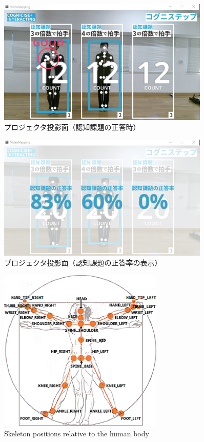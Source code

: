 \begin{figure}[tbp]
	\centering
			\includegraphics[width=0.9\textwidth]{chap2-figure/vm_clap.eps}
	\caption{プロジェクタ投影面（認知課題の正答時）}
	\label{fig:vm_clap}
\end{figure}

\begin{figure}[tbp]
	\centering
			\includegraphics[width=0.9\textwidth]{chap2-figure/vm_answer_rate.eps}
	\caption{プロジェクタ投影面（認知課題の正答率の表示）}
	\label{fig:vm_answer_rate}
\end{figure}

\begin{figure}[tbp]
	\centering
			\includegraphics[width=0.7\textwidth]{chap2-figure/skelton_position.eps}
	\caption{Skeleton positions relative to the human body}
	\label{fig:skelton_position}
\end{figure}


